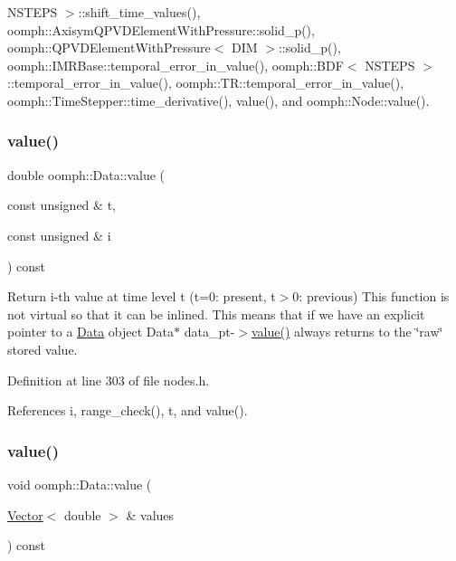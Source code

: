 N\+S\+T\+E\+P\+S $>$\+::shift\+\_\+time\+\_\+values(), oomph\+::\+Axisym\+Q\+P\+V\+D\+Element\+With\+Pressure\+::solid\+\_\+p(), oomph\+::\+Q\+P\+V\+D\+Element\+With\+Pressure$<$ D\+I\+M $>$\+::solid\+\_\+p(), oomph\+::\+I\+M\+R\+Base\+::temporal\+\_\+error\+\_\+in\+\_\+value(), oomph\+::\+B\+D\+F$<$ N\+S\+T\+E\+P\+S $>$\+::temporal\+\_\+error\+\_\+in\+\_\+value(), oomph\+::\+T\+R\+::temporal\+\_\+error\+\_\+in\+\_\+value(), oomph\+::\+Time\+Stepper\+::time\+\_\+derivative(), value(), and oomph\+::\+Node\+::value().

\mbox{\label{classoomph_1_1Data_a3fad35eda2f9e1c69f163f1cd4d104ea}} 
\subsubsection{\texorpdfstring{value()}{value()}\hspace{0.1cm}{\footnotesize\ttfamily [2/4]}}
{\footnotesize\ttfamily double oomph\+::\+Data\+::value (\begin{DoxyParamCaption}\item[{const unsigned \&}]{t,  }\item[{const unsigned \&}]{i }\end{DoxyParamCaption}) const\hspace{0.3cm}{\ttfamily [inline]}}



Return i-\/th value at time level t (t=0\+: present, t$>$0\+: previous) This function is not virtual so that it can be inlined. This means that if we have an explicit pointer to a \hyperlink{classoomph_1_1Data}{Data} object Data$\ast$ data\+\_\+pt-\/$>$\hyperlink{classoomph_1_1Data_a9383101536882db34e618cbe30dba2da}{value()} always returns to the \char`\"{}raw\char`\"{} stored value. 



Definition at line 303 of file nodes.\+h.



References i, range\+\_\+check(), t, and value().

\mbox{\label{classoomph_1_1Data_a0a28f485ac3508c1cc37d3e0b7e86efe}} 
\subsubsection{\texorpdfstring{value()}{value()}\hspace{0.1cm}{\footnotesize\ttfamily [3/4]}}
{\footnotesize\ttfamily void oomph\+::\+Data\+::value (\begin{DoxyParamCaption}\item[{\hyperlink{classoomph_1_1Vector}{Vector}$<$ double $>$ \&}]{values }\end{DoxyParamCaption}) const}



